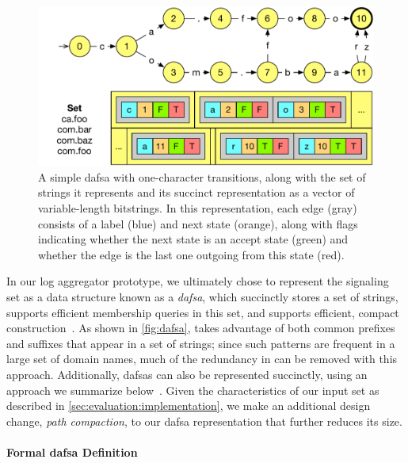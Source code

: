 \begin{figure}
  \centering
  \includegraphics[width=\linewidth]{fig/dafsa}
  \caption{A simple \ac{dafsa} with one-character transitions, along with the
    set of strings it represents and its succinct representation as a vector of
    variable-length bitstrings. In this representation, each edge (gray)
    consists of a label (blue) and next state (orange), along with flags
  indicating whether the next state is an accept state (green) and whether the
edge is the last one outgoing from this state (red).}
  \label{fig:dafsa}
\end{figure}

In our log aggregator prototype, we ultimately chose to represent the signaling
set as a data structure known as a \emph{\acf{dafsa}}, which succinctly stores a
set of strings, supports efficient membership queries in this set, and supports 
efficient, compact construction~\cite{daciuk2000incremental}. As shown
in \autoref{fig:dafsa},  takes advantage of both common prefixes and
suffixes that appear in a set of strings; since such patterns are frequent in a
large set of domain names, much of the redundancy in \httpsset can be removed with this
approach. Additionally, \acp{dafsa} can also be represented succinctly, using an
approach we summarize below~\cite{daciuk2012smaller}. Given the characteristics
of our input set as described in \autoref{sec:evaluation:implementation}, we
make an additional design change, \emph{path compaction},
to our \ac{dafsa} representation that further reduces its size.

\paragraph{Formal \ac{dafsa} Definition}

